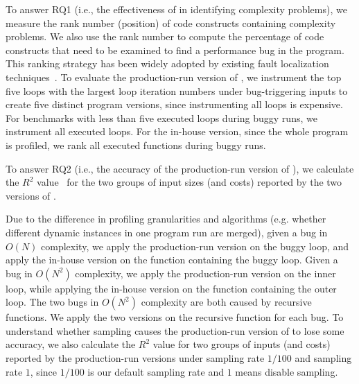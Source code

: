 To answer RQ1 (i.e., the effectiveness of  \Tool in identifying
complexity problems), we measure the rank number (position) of code
constructs containing complexity problems. We also use the rank number
to compute the percentage of code constructs
that need to be examined to find a performance bug in the program.
This ranking strategy has been widely adopted by existing fault localization 
techniques~\cite{Jones05,Cleve05}.
To evaluate the production-run version of \Tool,
we instrument the top five loops with the largest loop 
iteration numbers under bug-triggering inputs to 
create five distinct program versions, 
since instrumenting all loops is expensive. 
For benchmarks with less than five executed 
loops during buggy runs, 
we instrument all executed loops.  
For the in-house version, since the whole program is profiled, 
we rank all executed functions during buggy runs. 

To answer RQ2 (i.e., the accuracy of the production-run version of \Tool),
we calculate the $R^2$ value~\cite{rsquare} 
for the two groups of input sizes (and costs) reported by 
the two versions of \Tool.

Due to the difference in profiling granularities and algorithms 
(e.g. whether different dynamic instances in one program run are merged), 
given a bug in $O(N)$ complexity, 
we apply the production-run version on the buggy loop, 
and apply the in-house version on the function containing the buggy loop. 
Given a bug in $O(N^2)$ complexity, we apply the production-run version on the inner loop, 
while applying the in-house version on the function containing the outer loop. 
The two bugs in $O(N^2)$ complexity are both caused by recursive functions.
We apply the two versions on the recursive function for each bug. 
To understand whether sampling
causes the production-run version of \Tool 
to lose some accuracy, we also calculate the $R^2$ value for two groups 
of inputs (and costs) reported by the production-run versions 
under sampling rate $1/100$ and sampling rate $1$,
since $1/100$ is our default sampling rate and $1$ means disable sampling. 


